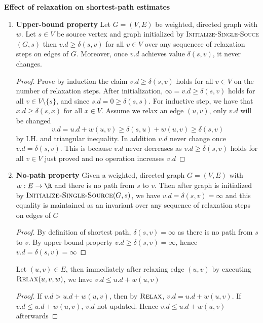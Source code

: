 \documentclass[11pt]{article}
\begin{document}
\begin{proposition*}
    \textbf{Effect of relaxation on shortest-path estimates}
    \begin{enumerate}
        \item \textbf{Upper-bound property} Let $G = (V,E)$ be weighted, directed graph with $w$. Let $s\in V$ be source vertex and graph initialized by \textsc{Initialize-Single-Souce}$(G,s)$ then $v.d\geq \delta(s,v)$ for all $v\in V$ over any sequenece of relaxation steps on edges of $G$. Moreover, once $v.d$ achieves value $\delta(s,v)$, it never changes.
        \begin{proof}
            Prove by induction the claim $v.d \geq \delta(s,v)$ holds for all $v\in V$ on the number of relaxation steps. After initialization, $\infty = v.d \geq \delta(s,v)$ holds for all $v\in V \setminus \{ s \}$, and since $s.d = 0 \geq \delta(s,s)$. For inductive step, we have that $x.d \geq \delta(s,x)$ for all $x\in V$. Assume we relax an edge $(u,v)$, only $v.d$ will be changed 
            \[
                v.d = u.d + w(u,v) \geq \delta(s, u) + w(u, v) \geq \delta(s,v)
            \]
            by I.H. and triangular inequality. In addition $v.d$ never change once $v.d = \delta(s,v)$. This is because $v.d$ never decreases as $v.d \geq \delta(s,v)$ holds for all $v\in V$ just proved and no operation increases $v.d$
        \end{proof}
        \item \textbf{No-path property} Given a weighted, directed graph $G = (V,E)$ with $w:E\to\R$ and there is no path from $s$ to $v$. Then after graph is initialized by $\textsc{Initialize-Single-Source}(G,s)$, we have $v.d = \delta(s,v) = \infty$ and this equality is maintained as an invariant over any sequence of relaxation steps on edges of $G$
        \begin{proof}
            By definition of shortest path, $\delta(s,v) = \infty$ as there is no path from $s$ to $v$. By upper-bound property $v.d \geq \delta(s,v) = \infty$, hence $v.d = \delta(s,v) = \infty$
        \end{proof}
        \begin{lemma*}
            Let $(u,v) \in E$, then immediately after relaxing edge $(u,v)$ by executing $\textsc{Relax}(u, v, w)$, we have $v.d \leq u.d + w(u,v)$
            \begin{proof}
                If $v.d > u.d + w(u,v)$, then by $\textsc{Relax}$, $v.d = u.d + w(u,v)$. If $v.d\leq u.d + w(u,v)$, $v.d$ not updated. Hence $v.d \leq u.d + w(u,v)$ afterwards

\end{proof}
\end{lemma*}
\end{enumerate}
\end{proposition*}
\end{document}
